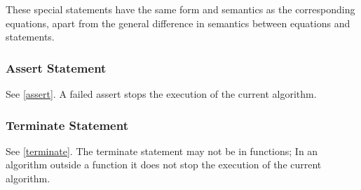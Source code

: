 These special statements have the same form and semantics as the
corresponding equations, apart from the general difference in semantics
between equations and statements.

\subsubsection{Assert Statement}\label{assert-statement}

See \cref{assert}. A failed assert stops the execution of the current
algorithm.

\subsubsection{Terminate Statement}\label{terminate-statement}

See \cref{terminate}. The terminate statement may not be in functions; In
an algorithm outside a function it does not stop the execution of the
current algorithm.
